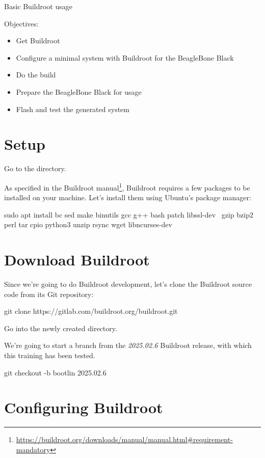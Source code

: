 \subchapter
{Basic Buildroot usage}
{Objectives:
  \begin{itemize}
  \item Get Buildroot
  \item Configure a minimal system with Buildroot for the BeagleBone
    Black
  \item Do the build
  \item Prepare the BeagleBone Black for usage
  \item Flash and test the generated system
  \end{itemize}
}

\section{Setup}

Go to the  directory.

As specified in the Buildroot
manual\footnote{\url{https://buildroot.org/downloads/manual/manual.html\#requirement-mandatory}},
Buildroot requires a few packages to be installed on your
machine. Let's install them using Ubuntu's package manager:

\begin{bashinput}
sudo apt install bc sed make binutils gcc g++ bash patch libssl-dev \
  gzip bzip2 perl tar cpio python3 unzip rsync wget libncurses-dev
\end{bashinput}

\section{Download Buildroot}

Since we're going to do Buildroot development, let's clone the
Buildroot source code from its Git repository:

\begin{bashinput}
git clone https://gitlab.com/buildroot.org/buildroot.git
\end{bashinput}

Go into the newly created  directory.

We're going to start a branch from the {\em 2025.02.6} Buildroot
release, with which this training has been tested.

\begin{bashinput}
git checkout -b bootlin 2025.02.6
\end{bashinput}

\section{Configuring Buildroot}

